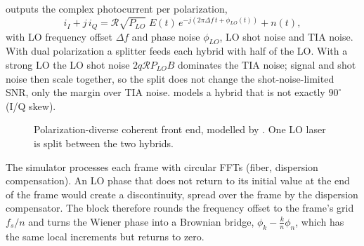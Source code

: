 outputs the complex photocurrent per polarization,
\begin{equation}
  i_I+j\,i_Q=\mathcal R\sqrt{P_{LO}}\;E(t)\,e^{-j(2\pi\Delta f\,t+\phi_{LO}(t))}+n(t),
\end{equation}
with LO frequency offset $\Delta f$ and phase noise $\phi_{LO}$, LO shot noise and TIA noise. With dual
polarization a splitter feeds each hybrid with half of the LO. With a strong LO the LO shot noise
$2q\mathcal RP_{LO}B$ dominates the TIA noise; signal and shot noise then scale together, so the split does
not change the shot-noise-limited SNR, only the margin over TIA noise. 
models a hybrid that is not exactly $90^\circ$ (I/Q skew).

\begin{figure}[htbp]
\centering
{}
\caption{Polarization-diverse coherent front end, modelled by . One LO laser is
split between the two hybrids.}
\label{fig:coherent-fe}
\end{figure}

\begin{incode}
The simulator processes each frame with circular FFTs (fiber, dispersion compensation). An LO
phase that does not return to its initial value at the end of the frame would create a
discontinuity, spread over the frame by the dispersion compensator. The block therefore rounds the
frequency offset to the frame's grid $f_s/n$ and turns the Wiener phase into a Brownian bridge,
$\phi_k-\frac kn\phi_n$, which has the same local increments but returns to zero.
\end{incode}

